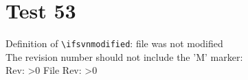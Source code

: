 \documentclass[12pt]{report}
\begin{document}
\chapter{Test 53}
Definition of \verb+\ifsvnmodified+: file was not modified\\

\noindent
The revision number should not include the 'M' marker:\\
Rev: \ifnum\svnrev>0 \fi
File Rev: \ifnum\svnfilerev>0 \fi

\end{document}
